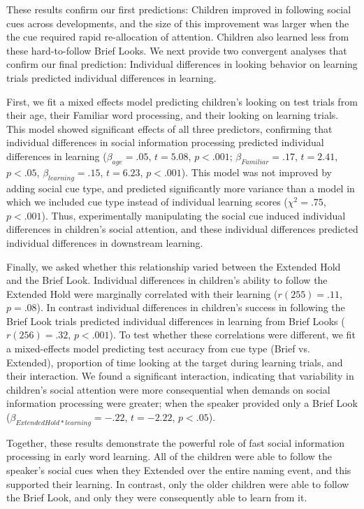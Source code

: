 \documentclass[man,floatsintext]{apa6}
\begin{document}
These results confirm our first predictions: Children improved in following social cues across developments, and the size of this improvement was larger when the the cue required rapid re-allocation of attention. Children also learned less from these hard-to-follow Brief Looks. We next provide two convergent analyses that confirm our final prediction: Individual differences in looking behavior on learning trials predicted individual differences in learning.

First, we fit a mixed effects model predicting children's looking on test trials from their age, their Familiar word processing, and their looking on learning trials. This model showed significant effects of all three predictors, confirming that individual differences in social information processing predicted individual differences in learning ($\beta_{age} = .05$, $t = 5.08$, $p < .001$; $\beta_{Familiar} = .17$, $t = 2.41$, $p < .05$, $\beta_{learning} = .15$, $t = 6.23$, $p < .001$). This model was not improved by adding social cue type, and predicted significantly more variance than a model in which we included cue type instead of individual learning scores ($\chi^{2} = .75$, $p < .001$). Thus, experimentally manipulating the social cue induced individual differences in children's social attention, and these individual differences predicted individual differences in downstream learning.

Finally, we asked whether this relationship varied between the Extended Hold and the Brief Look. Individual differences in children's ability to follow the Extended Hold were marginally correlated with their learning ($r(255) = .11$, $p = .08$). In contrast individual differences in children's success in following the Brief Look trials predicted individual differences in learning from Brief Looks ($r(256) = .32$, $p <.001$). To test whether these correlations were different, we fit a mixed-effects model predicting test accuracy from cue type (Brief vs. Extended), proportion of time looking at the target during learning trials, and their interaction. We found a significant interaction, indicating that variability in children's social attention were more consequential when demands on social information processing were greater; when the speaker provided only a Brief Look ($\beta_{Extended Hold * learning} = -.22$, $t = -2.22$, $p < .05$).

Together, these results demonstrate the powerful role of fast social information processing in early word learning. All of the children were able to follow the speaker's social cues when they Extended over the entire naming event, and this supported their learning. In contrast, only the older children were able to follow the Brief Look, and only they were consequently able to learn from it.
\end{document}
